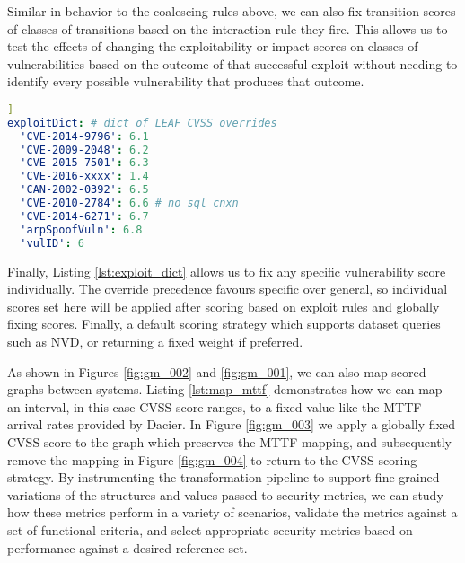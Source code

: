 Similar in behavior to the coalescing rules above, we can also fix transition scores of classes of transitions based on the interaction rule they fire. This allows us to test the effects of changing the exploitability or impact scores on classes of vulnerabilities based on the outcome of that successful exploit without needing to identify every possible vulnerability that produces that outcome.

\begin{minipage}{.95\linewidth}
\begin{lstlisting}[language=yaml, label={lst:exploit_dict}, caption={Override Specific Vulnerability Scores},captionpos=b,]]
exploitDict: # dict of LEAF CVSS overrides
  'CVE-2014-9796': 6.1
  'CVE-2009-2048': 6.2
  'CVE-2015-7501': 6.3
  'CVE-2016-xxxx': 1.4
  'CAN-2002-0392': 6.5
  'CVE-2010-2784': 6.6 # no sql cnxn
  'CVE-2014-6271': 6.7
  'arpSpoofVuln': 6.8
  'vulID': 6
\end{lstlisting}
\end{minipage}

Finally, Listing \ref{lst:exploit_dict} allows us to fix any specific vulnerability score individually. The override precedence favours specific over general, so individual scores set here will be applied after scoring based on exploit rules and globally fixing scores. Finally, a default scoring strategy which supports dataset queries such as NVD, or returning a fixed weight if preferred.


As shown in Figures \ref{fig:gm_002} and \ref{fig:gm_001}, we can also map scored graphs between systems. Listing \ref{lst:map_mttf} demonstrates how we can map an interval, in this case CVSS score ranges, to a fixed value like the MTTF arrival rates provided by Dacier\cite{Dacier_1996}. In Figure \ref{fig:gm_003} we apply a globally fixed CVSS score to the graph which preserves the MTTF mapping, and subsequently remove the mapping in Figure \ref{fig:gm_004} to return to the CVSS scoring strategy. By instrumenting the transformation pipeline to support fine grained variations of the structures and values passed to security metrics, we can study how these metrics perform in a variety of scenarios, validate the metrics against a set of functional criteria, and select appropriate security metrics based on performance against a desired reference set.